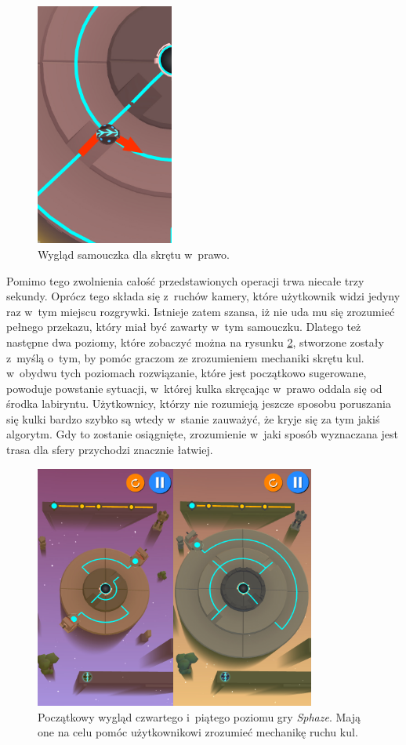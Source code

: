 \documentclass[a4paper,12pt,numbers=noenddot]{report}
\begin{document}
\begin{figure}[h!]
	\centering
  	\includegraphics[height=8cm]{fig/l3_closeup.jpg}
	\caption{Wygląd samouczka dla skrętu w~prawo.}
	\label{fig:tut_L3_2}
\end{figure}

Pomimo tego zwolnienia całość przedstawionych operacji trwa niecałe trzy sekundy. Oprócz tego składa się z~ruchów kamery, które użytkownik widzi jedyny raz w~tym miejscu rozgrywki. Istnieje zatem szansa, iż nie uda mu się zrozumieć pełnego przekazu, który miał być zawarty w~tym samouczku. Dlatego też następne dwa poziomy, które zobaczyć można na rysunku \ref{fig:tut_L3_3}, stworzone zostały z~myślą o~tym, by pomóc graczom ze zrozumieniem mechaniki skrętu kul. w~obydwu tych poziomach rozwiązanie, które jest początkowo sugerowane, powoduje powstanie sytuacji, w~której kulka skręcając w~prawo oddala się od środka labiryntu. Użytkownicy, którzy nie rozumieją jeszcze sposobu poruszania się kulki bardzo szybko są wtedy w~stanie zauważyć, że kryje się za tym jakiś algorytm. Gdy to zostanie osiągnięte, zrozumienie w~jaki sposób wyznaczana jest trasa dla sfery przychodzi znacznie łatwiej.

\begin{figure}[h!]
	\centering
  	\includegraphics[height=8cm]{fig/l4_l5.jpg}
	\caption{Początkowy wygląd czwartego i~piątego poziomu gry \textit{Sphaze}. Mają one na celu pomóc użytkownikowi zrozumieć mechanikę ruchu kul.}
	\label{fig:tut_L3_3}
\end{figure}
\end{document}
